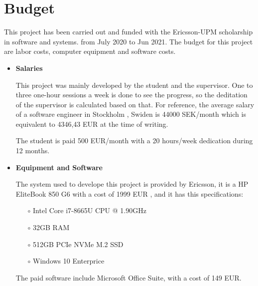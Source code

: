 \chapter{Budget} 
\label{chap:economic}

This project has been carried out and funded with the Ericsson-UPM scholarship in software and systems.
from July 2020 to Jun 2021. The budget for this project are labor costs, computer equipment
and software costs.

\begin{itemize}
  \item \textbf{Salaries}
  
  This project was mainly developed by the student and the supervisor. One to three one-hour sessions a week is 
  done to see the progress, so the deditation of the supervisor is calculated based on that.
  For reference, the average salary of a software engineer in Stockholm \cite{glsd}, Swiden is 44000 SEK/month which 
  is equivalent to 4346,43 EUR at the time of writing. 

  The student is paid 500 EUR/month with a 20 hours/week dedication during 12 months.

  \item \textbf{Equipment and Software}
  
  The system used to develope this project is provided by Ericsson, it is a HP EliteBook 850 G6 with a cost of 1999 EUR
  , and it has this specifications:
  \begin{itemize}
    \item [$\circ$] Intel Core i7-8665U CPU @ 1.90GHz
    \item [$\circ$] 32GB RAM
    \item [$\circ$] 512GB PCIe NVMe M.2 SSD
    \item [$\circ$] Windows 10 Enterprice
  \end{itemize}

  The paid software include Microsoft Office Suite, with a cost of 149 EUR.
\end{itemize}

